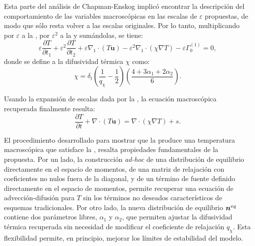 Esta parte del an\'alisis de Chapman-Enskog implic\'o encontrar la descripci\'on del comportamiento de las variables macrosc\'opicas en las escalas de $\varepsilon$ propuestas, de modo que s\'olo resta volver a las escalas originales. Por lo tanto, multiplicando por $\varepsilon$ a la , por $\varepsilon^2$ a la  y sum\'andolas, se tiene:
\begin{equation}
	\varepsilon \dfrac{\partial T}{\partial t_1} + \varepsilon^2 \dfrac{\partial T}{\partial t_2} + \varepsilon \nabla_1 \cdot (T\bm{u}) - \varepsilon^2 \nabla_1 \cdot (\chi \nabla T) - \varepsilon \Gamma_0^{(1)} = 0,
\end{equation}
donde se define a la difusividad t\'ermica $\chi$ como:
\begin{equation}
	\chi = \delta_t \left( \dfrac{1}{q_{\chi}} - \dfrac{1}{2} \right) \left( \dfrac{4+3\alpha_1 + 2\alpha_2}{6} \right).
	\label{eq:modelo_2d_chi}
\end{equation}

Usando la expansi\'on de escalas dada por la , la ecuaci\'on macrosc\'opica recuperada finalmente resulta:
\begin{equation}
	\dfrac{\partial T}{\partial t} + \nabla \cdot (T\bm{u}) = \nabla \cdot (\chi \nabla T) + s.
	\label{eq:T_2d}
\end{equation}

El procedimiento desarrollado para mostrar que la  produce una temperatura macrosc\'opica que satisface la , resalta propiedades fundamentales de la propuesta. Por un lado, la construcci\'on \emph{ad-hoc} de una distribuci\'on de equilibrio directamente en el espacio de momentos, de una matriz de relajaci\'on con coeficientes no nulos fuera de la diagonal, y de un t\'ermino de fuente definido directamente en el espacio de momentos, permite recuperar una ecuaci\'on de advecci\'on-difusi\'on para $T$ sin los t\'erminos no deseados caracter\'isticos de esquemas tradicionales. Por otro lado, la nueva distribuci\'on de equilibrio $\bm{n}^{eq}$ contiene dos par\'ametros libres, $\alpha_1$ y $\alpha_2$, que permiten ajustar la difusividad t\'ermica recuperada sin necesidad de modificar el coeficiente de relajaci\'on $q_{\chi}$. Esta flexibilidad permite, en principio, mejorar los l\'imites de estabilidad del modelo.

